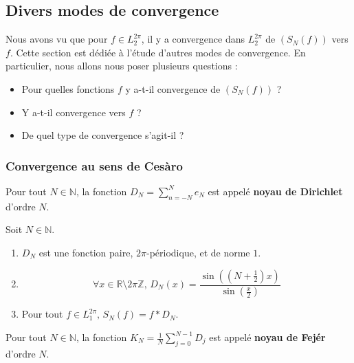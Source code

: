 	\newpage
	\subsection{Divers modes de convergence}


	Nous avons vu que pour $f \in L_2^{2\pi}$, il y a convergence dans $L_2^{2\pi}$ de $(S_N(f))$ vers $f$. Cette section est dédiée à l'étude d'autres modes de convergence. En particulier, nous allons nous poser plusieurs questions :

	\begin{itemize}
		\item Pour quelles fonctions $f$ y a-t-il convergence de $(S_N(f))$ ?
		\item Y a-t-il convergence vers $f$ ?
		\item De quel type de convergence s'agit-il ?
	\end{itemize}

	\subsubsection{Convergence au sens de Cesàro}


	\begin{definition}
		Pour tout $N \in \mathbb{N}$, la fonction $D_N = \sum_{n=-N}^{N} e_N$ est appelé \textbf{noyau de Dirichlet} d'ordre $N$.
	\end{definition}

	\begin{proposition}
		Soit $N \in \mathbb{N}$.
		\begin{enumerate}[label=(\roman*)]
			\item $D_N$ est une fonction paire, $2\pi$-périodique, et de norme $1$.
			\item \[ \forall x \in \mathbb{R} \setminus 2 \pi \mathbb{Z}, \, D_N(x) = \frac{\sin \left(\left( N + \frac{1}{2} \right) x \right)}{\sin \left( \frac{x}{2} \right)} \]
			\item Pour tout $f \in L_1^{2 \pi}, \, S_N(f) = f * D_N$.
		\end{enumerate}
	\end{proposition}

	\begin{definition}
		Pour tout $N \in \mathbb{N}$, la fonction $K_N = \frac{1}{N} \sum_{j=0}^{N-1} D_j$ est appelé \textbf{noyau de Fejér} d'ordre $N$.
	\end{definition}

